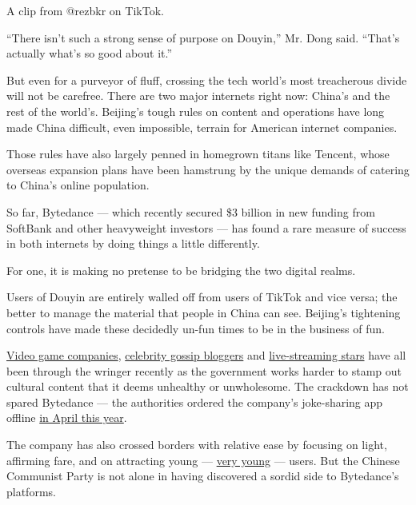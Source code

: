 A clip from @rezbkr on TikTok.

``There isn't such a strong sense of purpose on Douyin,'' Mr. Dong said.
``That's actually what's so good about it.''

But even for a purveyor of fluff, crossing the tech world's most
treacherous divide will not be carefree. There are two major internets
right now: China's and the rest of the world's. Beijing's tough rules on
content and operations have long made China difficult, even impossible,
terrain for American internet companies.

Those rules have also largely penned in homegrown titans like Tencent,
whose overseas expansion plans have been hamstrung by the unique demands
of catering to China's online population.

So far, Bytedance --- which recently secured \$3 billion in new funding
from SoftBank and other heavyweight investors --- has found a rare
measure of success in both internets by doing things a little
differently.

For one, it is making no pretense to be bridging the two digital realms.

Users of Douyin are entirely walled off from users of TikTok and vice
versa; the better to manage the material that people in China can see.
Beijing's tightening controls have made these decidedly un-fun times to
be in the business of fun.

\href{https://www.nytimes3xbfgragh.onion/2018/08/31/technology/china-videogames-myopia-tencent.html}{Video
game companies},
\href{https://www.nytimes3xbfgragh.onion/2017/06/09/world/asia/china-celebrity-news-wechat.html}{celebrity
gossip bloggers} and
\href{https://www.nytimes3xbfgragh.onion/2018/10/16/world/asia/china-yang-kaili-anthem.html}{live-streaming
stars} have all been through the wringer recently as the government
works harder to stamp out cultural content that it deems unhealthy or
unwholesome. The crackdown has not spared Bytedance --- the authorities
ordered the company's joke-sharing app offline
\href{https://www.nytimes3xbfgragh.onion/2018/04/11/technology/china-toutiao-bytedance-censor.html}{in
April this year}.

The company has also crossed borders with relative ease by focusing on
light, affirming fare, and on attracting young ---
\href{https://www.nytimes3xbfgragh.onion/2016/09/17/business/media/a-social-network-frequented-by-children-tests-the-limits-of-online-regulation.html}{very
young} --- users. But the Chinese Communist Party is not alone in having
discovered a sordid side to Bytedance's platforms.

